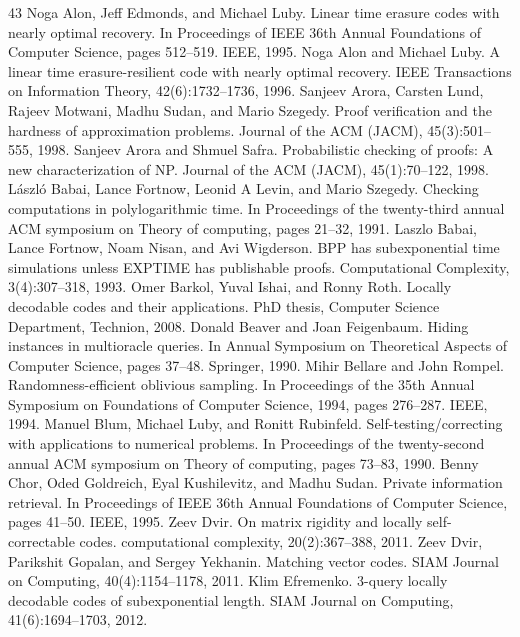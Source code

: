 \begin{thebibliography}{43}
Noga Alon, Jeff Edmonds, and Michael Luby. Linear time erasure codes with nearly optimal recovery. In Proceedings of IEEE 36th Annual Foundations of Computer Science, pages 512–519. IEEE, 1995.
Noga Alon and Michael Luby. A linear time erasure-resilient code with nearly optimal recovery. IEEE Transactions on Information Theory, 42(6):1732–1736, 1996.
Sanjeev Arora, Carsten Lund, Rajeev Motwani, Madhu Sudan, and Mario Szegedy. Proof verification and the hardness of approximation problems. Journal of the ACM (JACM), 45(3):501–555, 1998.
Sanjeev Arora and Shmuel Safra. Probabilistic checking of proofs: A new characterization of NP. Journal of the ACM (JACM), 45(1):70–122, 1998.
László Babai, Lance Fortnow, Leonid A Levin, and Mario Szegedy. Checking computations in polylogarithmic time. In Proceedings of the twenty-third annual ACM symposium on Theory of computing, pages 21–32, 1991.
Laszlo Babai, Lance Fortnow, Noam Nisan, and Avi Wigderson. BPP has subexponential time simulations unless EXPTIME has publishable proofs. Computational Complexity, 3(4):307–318, 1993.
Omer Barkol, Yuval Ishai, and Ronny Roth. Locally decodable codes and their applications. PhD thesis, Computer Science Department, Technion, 2008.
Donald Beaver and Joan Feigenbaum. Hiding instances in multioracle queries. In Annual Symposium on Theoretical Aspects of Computer Science, pages 37–48. Springer, 1990.
Mihir Bellare and John Rompel. Randomness-efficient oblivious sampling. In Proceedings of the 35th Annual Symposium on Foundations of Computer Science, 1994, pages 276–287. IEEE, 1994.
Manuel Blum, Michael Luby, and Ronitt Rubinfeld. Self-testing/correcting with applications to numerical problems. In Proceedings of the twenty-second annual ACM symposium on Theory of computing, pages 73–83, 1990.
Benny Chor, Oded Goldreich, Eyal Kushilevitz, and Madhu Sudan. Private information retrieval. In Proceedings of IEEE 36th Annual Foundations of Computer Science, pages 41–50. IEEE, 1995.
Zeev Dvir. On matrix rigidity and locally self-correctable codes. computational complexity, 20(2):367–388, 2011.
Zeev Dvir, Parikshit Gopalan, and Sergey Yekhanin. Matching vector codes. SIAM Journal on Computing, 40(4):1154–1178, 2011.
Klim Efremenko. 3-query locally decodable codes of subexponential length. SIAM Journal on Computing, 41(6):1694–1703, 2012.

\end{thebibliography}
